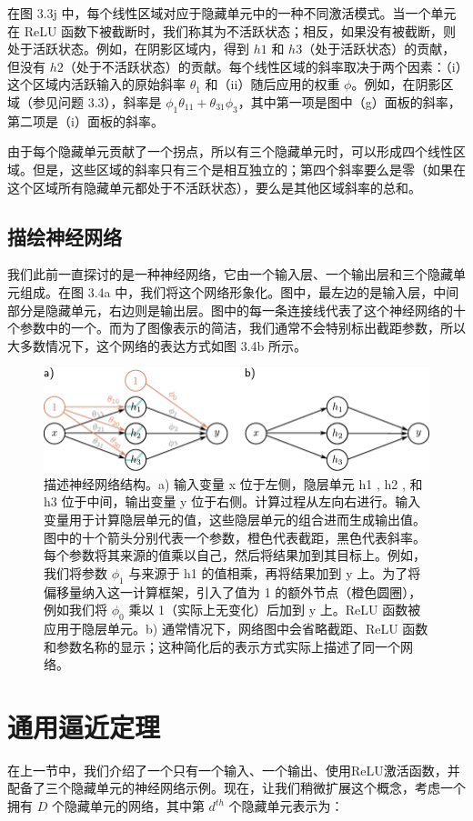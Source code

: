 \documentclass[lang=cn,newtx,10pt,scheme=chinese]{elegantbook}
\begin{document}
在图 3.3j 中，每个线性区域对应于隐藏单元中的一种不同激活模式。当一个单元在 ReLU 函数下被截断时，我们称其为不活跃状态；相反，如果没有被截断，则处于活跃状态。例如，在阴影区域内，得到 \(h1\) 和 \(h3\)（处于活跃状态）的贡献，但没有 \(h2\)（处于不活跃状态）的贡献。每个线性区域的斜率取决于两个因素：（i）这个区域内活跃输入的原始斜率 \(\theta_1\) 和（ii）随后应用的权重 \(\phi\)。例如，在阴影区域（参见问题 3.3），斜率是 \(\phi_1\theta_{11} + \theta_{31}\phi_3\)，其中第一项是图中（g）面板的斜率，第二项是（i）面板的斜率。

由于每个隐藏单元贡献了一个拐点，所以有三个隐藏单元时，可以形成四个线性区域。但是，这些区域的斜率只有三个是相互独立的；第四个斜率要么是零（如果在这个区域所有隐藏单元都处于不活跃状态），要么是其他区域斜率的总和。

\subsection{描绘神经网络}

我们此前一直探讨的是一种神经网络，它由一个输入层、一个输出层和三个隐藏单元组成。在图 3.4a 中，我们将这个网络形象化。图中，最左边的是输入层，中间部分是隐藏单元，右边则是输出层。图中的每一条连接线代表了这个神经网络的十个参数中的一个。而为了图像表示的简洁，我们通常不会特别标出截距参数，所以大多数情况下，这个网络的表达方式如图 3.4b 所示。

\begin{figure}[ht!]
	\centering
	\includegraphics[width=0.7\linewidth]{PDFFigures/UDLChap3PDF/ShallowNet.pdf}
  \caption{描述神经网络结构。a) 输入变量 x 位于左侧，隐层单元 h1 , h2 , 和 h3 位于中间，输出变量 y 位于右侧。计算过程从左向右进行。输入变量用于计算隐层单元的值，这些隐层单元的组合进而生成输出值。图中的十个箭头分别代表一个参数，橙色代表截距，黑色代表斜率。每个参数将其来源的值乘以自己，然后将结果加到其目标上。例如，我们将参数 $\phi_1$ 与来源于 h1 的值相乘，再将结果加到 y 上。为了将偏移量纳入这一计算框架，引入了值为 1 的额外节点（橙色圆圈），例如我们将 \(\phi_0\) 乘以 1（实际上无变化）后加到 y 上。ReLU 函数被应用于隐层单元。b) 通常情况下，网络图中会省略截距、ReLU 函数和参数名称的显示；这种简化后的表示方式实际上描述了同一个网络。}
\end{figure}

\section{通用逼近定理}
在上一节中，我们介绍了一个只有一个输入、一个输出、使用ReLU激活函数，并配备了三个隐藏单元的神经网络示例。现在，让我们稍微扩展这个概念，考虑一个拥有 \(D\) 个隐藏单元的网络，其中第 \(d^{th}\) 个隐藏单元表示为：
\end{document}
